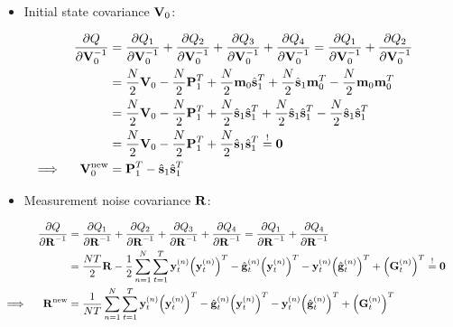 	\begin{itemize}
		\item Initial state covariance \(\mat{V}_0\):
	\end{itemize}
	\begin{align}
		&&\pdv{Q}{\mat{V}_0^{-1}}
			&= \pdv{Q_1}{\mat{V}_0^{-1}} + \pdv{Q_2}{\mat{V}_0^{-1}} + \pdv{Q_3}{\mat{V}_0^{-1}} + \pdv{Q_4}{\mat{V}_0^{-1}} = \pdv{Q_1}{\mat{V}_0^{-1}} + \pdv{Q_2}{\mat{V}_0^{-1}} & \nonumber \\
		&&	&= \frac{N}{2} \mat{V}_0 - \frac{N}{2} \mat{P}_1^T + \frac{N}{2} \vec{m}_0 \hat{\vec{s}}_1^T + \frac{N}{2} \hat{\vec{s}}_1 \vec{m}_0^T - \frac{N}{2} \vec{m}_0 \vec{m}_0^T & \nonumber \\
		&&	&= \frac{N}{2} \mat{V}_0 - \frac{N}{2} \mat{P}_1^T + \frac{N}{2} \hat{\vec{s}}_1 \hat{\vec{s}}_1^T + \frac{N}{2} \hat{\vec{s}}_1 \hat{\vec{s}}_1^T - \frac{N}{2} \hat{\vec{s}}_1 \hat{\vec{s}}_1^T & \nonumber \\
		&&	&= \frac{N}{2} \mat{V}_0 - \frac{N}{2} \mat{P}_1^T + \frac{N}{2} \hat{\vec{s}}_1 \hat{\vec{s}}_1^T \overset{!}{=} \mat{0} & \nonumber \\
		\implies && \mat{V}_0^\new &= \mat{P}_1^T - \hat{\vec{s}}_1 \hat{\vec{s}}_1^T & \label{eq:initialStateCovariance}
	\end{align}

	\begin{itemize}
		\item Measurement noise covariance \(\mat{R}\):
	\end{itemize}
	\begin{align}
		&&\pdv{Q}{\mat{R}^{-1}}
			&= \pdv{Q_1}{\mat{R}^{-1}} + \pdv{Q_2}{\mat{R}^{-1}} + \pdv{Q_3}{\mat{R}^{-1}} + \pdv{Q_4}{\mat{R}^{-1}} = \pdv{Q_1}{\mat{R}^{-1}} + \pdv{Q_4}{\mat{R}^{-1}} & \nonumber \\
		&&	&= \frac{NT}{2} \mat{R} - \frac{1}{2} \sum_{n = 1}^{N} \sum_{t = 1}^{T} \vec{y}_t^{(n)} \Big(\vec{y}_t^{(n)}\Big)^T - \hat{\vec{g}}_t^{(n)} \Big(\vec{y}_t^{(n)}\Big)^T - \vec{y}_t^{(n)} \Big(\hat{\vec{g}}_t^{(n)}\Big)^T + \Big(\mat{G}_t^{(n)}\Big)^T \overset{!}{=} \mat{0} & \nonumber \\
		\implies && \mat{R}^\new &= \frac{1}{NT} \sum_{n = 1}^{N} \sum_{t = 1}^{T} \vec{y}_t^{(n)} \Big(\vec{y}_t^{(n)}\Big)^T - \hat{\vec{g}}_t^{(n)} \Big(\vec{y}_t^{(n)}\Big)^T - \vec{y}_t^{(n)} \Big(\hat{\vec{g}}_t^{(n)}\Big)^T + \Big(\mat{G}_t^{(n)}\Big)^T & \label{eq:measurementNoiseCovariance}
	\end{align}

